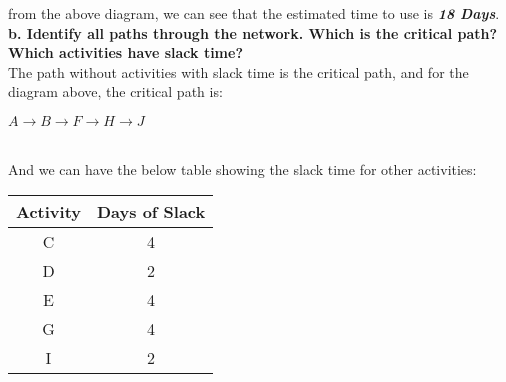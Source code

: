 \documentclass{article}
\begin{document}
\begin{minipage}{0.94\textwidth}
\begin{adjustbox}{scale=0.68,center}
            \end{adjustbox}
        from the above diagram, we can see that the estimated time to use is \textbf{\textit{18 Days}}. \\[1em]
    \textbf{b. Identify all paths through the network. Which is the critical path? Which activities have slack time?}\\[0.5em]
            The path without activities with slack time is the critical path, and for the diagram above, the critical path is:\\
            \begin{minipage}{\textwidth}
                \centering
                $A \rightarrow B \rightarrow F \rightarrow H \rightarrow J$
            \end{minipage}\\
        And we can have the below table showing the slack time for other activities:
\end{minipage}
    \begin{table}[h!]
        \centering
        \begin{tabular}{|c|c|}
        \hline
        \textbf{Activity} & \textbf{Days of Slack}\\ \hline
        C & 4 \\ \hline
        D & 2 \\ \hline
        E & 4 \\ \hline
        G & 4 \\ \hline
        I & 2 \\ \hline
        \end{tabular}
    \end{table}\\
  
\end{document}
